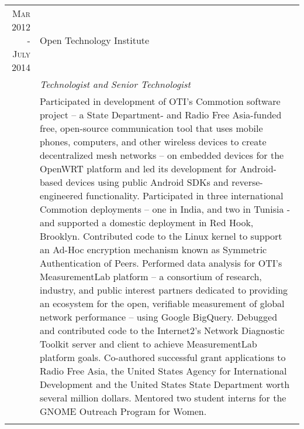 \documentclass[a4paper,10pt]{article} %
\begin{document}
\begin{tabular}{r|p{11cm}}

\textsc{Mar 2012 - July 2014} & Open Technology Institute \\
& \emph{Technologist and Senior Technologist}\\ 
& \footnotesize{Participated in development of OTI’s Commotion software project – a State Department- and Radio Free Asia-funded free, open-source communication tool that uses mobile phones, computers, and other wireless devices to create decentralized mesh networks – on embedded devices for the OpenWRT platform and led its development for Android-based devices using public Android SDKs and reverse-engineered functionality. Participated in three international Commotion deployments – one in India, and two in Tunisia - and supported a domestic deployment in Red Hook, Brooklyn. Contributed code to the Linux kernel to support an Ad-Hoc encryption mechanism known as Symmetric Authentication of Peers. Performed data analysis for OTI’s MeasurementLab platform – a consortium of research, industry, and public interest partners dedicated to providing an ecosystem for the open, verifiable measurement of global network performance – using Google BigQuery. Debugged and contributed code to the Internet2’s Network Diagnostic Toolkit server and client to achieve MeasurementLab platform goals. Co-authored successful grant applications to Radio Free Asia, the United States Agency for International Development and the United States State Department worth several million dollars. Mentored two student interns for the GNOME Outreach Program for Women.}\\
\multicolumn{2}{c}{	} \\



\end{tabular}
\end{document}
